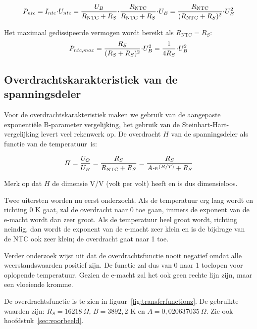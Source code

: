 \documentclass[12pt,a4paper,final,twoside,fleqn]{article}
\newcommand{\rntc}{R_\text{NTC}}
\let\oldcdot\cdot
\renewcommand{\cdot}{\kern-.10em\oldcdot\kern-.10em}
\begin{document}
\begin{equation}
P_{ntc} = I_{ntc}\cdot U_{ntc} = \dfrac{U_B}{\rntc+R_S}\cdot \dfrac{\rntc}{\rntc+R_S}\cdot U_B = \dfrac{\rntc}{(\rntc+R_S)^2}\cdot U_B^2
\end{equation} 

Het maximaal gedissipeerde vermogen wordt bereikt als $\rntc = R_S$:
\begin{equation}
P_{ntc,max} = \dfrac{R_S}{(R_S+R_S)^2}\cdot U_B^2 = \dfrac{1}{4R_S}\cdot U_B^2
\end{equation}

\subsection{Overdrachtskarakteristiek van de spanningsdeler}
Voor de overdrachtskarakteristiek maken we gebruik van de aangepaste exponenti\"ele
B-parameter vergelijking, het gebruik van de Steinhart-Hart-vergelijking
levert veel rekenwerk op.
De overdracht $H$ van de spanningsdeler als functie van de temperatuur~is:

\begin{equation}
\label{equ:transferh}
H = \dfrac{U_O}{U_B} = \dfrac{R_S}{\rntc + R_S}=\dfrac{R_S}{A\cdot\text{e}^{\,(B/T)}+R_S}
\end{equation}

Merk op dat $H$ de dimensie V/V (volt per volt) heeft en is dus dimensieloos.

Twee uitersten worden nu eerst onderzocht. Als de temperatuur erg laag wordt en
richting 0 K gaat, zal de overdracht naar 0 toe gaan, immers de exponent van de
e-macht wordt dan zeer groot. Als de temperatuur heel groot wordt, richting 
neindig, dan wordt de exponent van de e-macht zeer klein en is de bijdrage van de
NTC ook zeer klein; de overdracht gaat naar 1 toe.

Verder onderzoek wijst uit dat de overdrachtsfunctie nooit negatief omdat alle
weerstandswaarden positief zijn. De functie zal dus van 0 naar 1 toelopen voor
oplopende temperatuur. Gezien de e-macht zal het ook geen rechte lijn zijn, maar
een vloeiende kromme.

De overdrachtsfunctie is te zien in figuur~\ref{fig:transferfunctionz}. De
gebruikte waarden zijn: $R_S = 16218\ \Omega$, $B = 3892,2$ K en
$A = 0,020637035\ \Omega$. Zie  ook hoofdstuk~\ref{sec:voorbeeld}.
\end{document}

